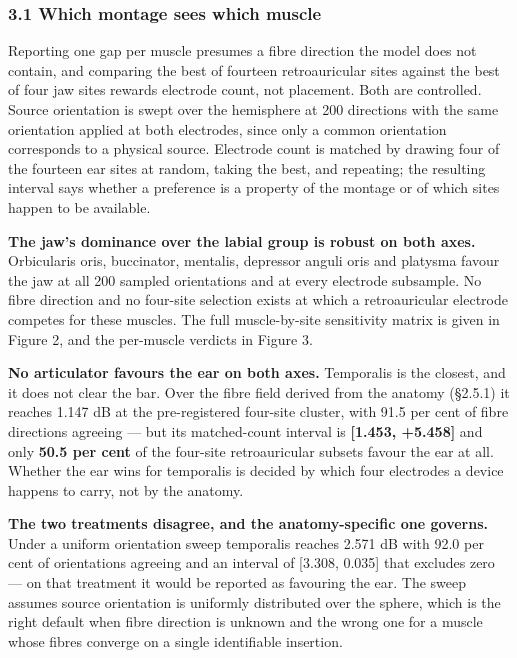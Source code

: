 \documentclass[
  11pt,
  letterpaper,
]{article}
\begin{document}
\subsubsection{3.1 Which montage sees which muscle}\label{which-montage-sees-which-muscle}

Reporting one gap per muscle presumes a fibre direction the model does not
contain, and comparing the best of fourteen retroauricular sites against the
best of four jaw sites rewards electrode count, not placement. Both are
controlled. Source orientation is swept over the hemisphere at 200 directions
with the same orientation applied at both electrodes, since only a common
orientation corresponds to a physical source. Electrode count is matched by
drawing four of the fourteen ear sites at random, taking the best, and
repeating; the resulting interval says whether a preference is a property of
the montage or of which sites happen to be available.

\textbf{The jaw's dominance over the labial group is robust on both axes.}
Orbicularis oris, buccinator, mentalis, depressor anguli oris and platysma
favour the jaw at all 200 sampled orientations and at every electrode
subsample. No fibre direction and no four-site selection exists at which a
retroauricular electrode competes for these muscles. The full muscle-by-site
sensitivity matrix is given in Figure 2, and the per-muscle verdicts in
Figure 3.

\textbf{No articulator favours the ear on both axes.} Temporalis is the closest,
and it does not clear the bar. Over the fibre field derived from the anatomy
(\S{}2.5.1) it reaches \textminus{}1.147 dB at the pre-registered four-site cluster, with
91.5 per cent of fibre directions agreeing --- but its matched-count interval is
\textbf{{[}\textminus{}1.453, +5.458{]}} and only \textbf{50.5 per cent} of the four-site
retroauricular subsets favour the ear at all. Whether the ear wins for
temporalis is decided by which four electrodes a device happens to carry, not
by the anatomy.

\textbf{The two treatments disagree, and the anatomy-specific one governs.} Under a
uniform orientation sweep temporalis reaches \textminus{}2.571 dB with 92.0 per cent of
orientations agreeing and an interval of {[}\textminus{}3.308, \textminus{}0.035{]} that excludes zero ---
on that treatment it would be reported as favouring the ear. The sweep assumes
source orientation is uniformly distributed over the sphere, which is the right
default when fibre direction is unknown and the wrong one for a muscle whose
fibres converge on a single identifiable insertion.
\end{document}
